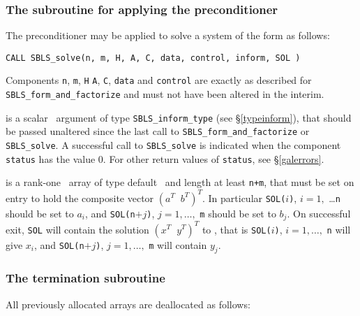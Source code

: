 \documentclass{galahad}
\newcommand{\packagename}{SBLS}
\begin{document}
\subsubsection{The subroutine for applying the preconditioner}
The preconditioner may be applied to solve a system of the 
form  as follows:
\vspace*{1mm}

\hspace{8mm}
{\tt CALL \packagename\_solve(n, m, H, A, C, data, control, inform, SOL )}
\vspace*{1mm}

\noindent
Components {\tt n}, {\tt m},  {\tt H} {\tt A}, {\tt C}, {\tt data} and
{\tt control} are exactly as described for 
{\tt \packagename\_form\_and\_factorize} and must not have been
altered in the interim. 

\vspace*{-3mm}
\begin{description}

 is a scalar \intentout\ argument of type 
{\tt \packagename\_inform\_type}
(see \S\ref{typeinform}), that should be passed unaltered since 
the last call to {\tt \packagename\_form\_and\_factorize} or
{\tt \packagename\_solve}.  A successful call to
{\tt \packagename\_solve}
is indicated when the  component {\tt status} has the value 0. 
For other return values of {\tt status}, see \S\ref{galerrors}.

 is a rank-one  \intentinout\ array of type default \real\
and length at least {\tt n+m}, that must be set on entry to hold
the composite vector $( a^T \;\; b^T)^T$. 
In particular {\tt SOL(}$i${\tt )}, $i = 1,$ \ldots {\tt n} should be
set to $a_i$, and 
{\tt SOL(n}$+j${\tt )}, $j = 1, \ldots,$ {\tt m} should be
set to $b_j$. On successful exit, {\tt SOL}
will contain the solution $( x^T \;\; y^T)^T$ to , that is
{\tt SOL(}$i${\tt )}, $i = 1, \ldots,$ {\tt n} will give
$x_i$, and  {\tt SOL(n}$+j${\tt )}, $j = 1,\ldots,$ {\tt m} will contain 
$y_j$.



\end{description}


\subsubsection{The  termination subroutine}
All previously allocated arrays are deallocated as follows:
\vspace*{1mm}
\end{document}
